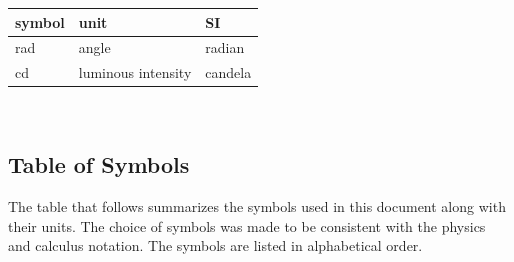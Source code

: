 \documentclass[12pt]{article}
\begin{document}
\renewcommand{\arraystretch}{1.2}
\noindent \begin{tabular}{l l l} 
	\toprule		
	\textbf{symbol} & \textbf{unit} & \textbf{SI}\\
	\midrule 
	\si{\radian} & angle & radian\\
	\si{cd} & luminous intensity & candela\\ 	
	\bottomrule
\end{tabular}
~\newline
{}\\

\subsection{Table of Symbols}

The table that follows summarizes the symbols used in this document along with
their units.  The choice of symbols was made to be consistent with the physics 
and calculus notation. The symbols are listed in alphabetical order.
\end{document}
